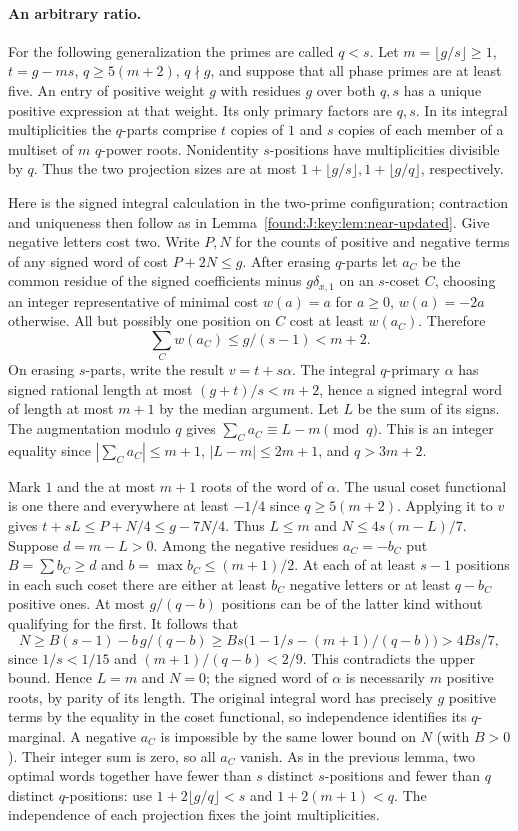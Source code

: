\documentclass[11pt,a4paper]{article}
\numberwithin{equation}{section}
\theoremstyle{remark}
\begin{document}
\paragraph{An arbitrary ratio.}
For the following generalization the primes are called $q<s$.
Let $m=\lfloor g/s\rfloor\ge1$, $t=g-ms$, $q\ge5(m+2)$, $q\nmid g$,
and suppose that all phase primes are at least five. An entry of
positive weight $g$ with residues $g$ over both $q,s$ has a unique
positive expression at that weight. Its only primary factors are
$q,s$. In its integral multiplicities the $q$-parts comprise $t$
copies of $1$ and $s$ copies of each member of a multiset of $m$
$q$-power roots. Nonidentity $s$-positions have multiplicities divisible
by $q$. Thus the two projection sizes are at most
$1+\lfloor g/s\rfloor,1+\lfloor g/q\rfloor$, respectively.

Here is the signed integral calculation in the two-prime configuration;
contraction and uniqueness then follow as in Lemma~\ref{found:J:key:lem:near-updated}.
Give negative letters cost two. Write $P,N$ for the counts of positive
and negative terms of any signed word of cost $P+2N\le g$. After
erasing $q$-parts let $a_C$ be the common residue of the signed
coefficients minus $g\delta_{x,1}$ on an $s$-coset $C$, choosing
an integer representative of minimal cost
$w(a)=a$ for $a\ge0$, $w(a)=-2a$ otherwise. All but possibly one
position on $C$ cost at least $w(a_C)$. Therefore
\[
 \sum_C w(a_C)\le g/(s-1)<m+2.
\]
On erasing $s$-parts, write the result $v=t+s\alpha$. The integral
$q$-primary $\alpha$ has signed rational length at most
$(g+t)/s<m+2$, hence a signed integral word of length at most $m+1$
by the median argument. Let $L$ be the sum of its signs.
The augmentation modulo $q$ gives
$\sum_Ca_C\equiv L-m\pmod q$. This is an integer equality since
$|\sum_C a_C|\le m+1$, $|L-m|\le 2m+1$, and $q>3m+2$.

Mark $1$ and the at most $m+1$ roots of the word of $\alpha$.
The usual coset functional is one there and everywhere at least
$-1/4$ since $q\ge5(m+2)$. Applying it to $v$ gives
$t+sL\le P+N/4\le g-7N/4$. Thus $L\le m$ and
$N\le 4s(m-L)/7$.
Suppose $d=m-L>0$. Among the negative residues $a_C=-b_C$
put $B=\sum b_C\ge d$ and $b=\max b_C\le(m+1)/2$.
At each of at least $s-1$ positions in each such coset there
are either at least $b_C$ negative letters or at least $q-b_C$
positive ones. At most $g/(q-b)$ positions can be of the latter
kind without qualifying for the first. It follows that
\[
 N\ge B(s-1)-b\,g/(q-b)
   \ge Bs\big(1-1/s-(m+1)/(q-b)\big)>4Bs/7,
\]
since $1/s<1/15$ and $(m+1)/(q-b)<2/9$. This contradicts the
upper bound. Hence $L=m$ and $N=0$; the signed word of $\alpha$
is necessarily $m$ positive roots, by parity of its length. The
original integral word has precisely $g$ positive terms by the equality
in the coset functional, so independence identifies its $q$-marginal.
A negative $a_C$ is impossible by the same lower bound on $N$
(with $B>0$). Their integer sum is zero, so all $a_C$ vanish.
As in the previous lemma, two optimal words together have fewer
than $s$ distinct $s$-positions and fewer than $q$ distinct $q$-positions:
use $1+2\lfloor g/q\rfloor<s$ and $1+2(m+1)<q$. The independence
of each projection fixes the joint multiplicities.
\end{document}
